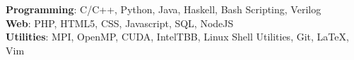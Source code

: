 {
    \normalsize

\textbf{Programming}: C/C++, Python, Java, Haskell, Bash Scripting, Verilog\\
\textbf{Web}: PHP, HTML5, CSS, Javascript, SQL, NodeJS\\
\textbf{Utilities}: MPI, OpenMP, CUDA, IntelTBB, Linux Shell Utilities, Git, \LaTeX, Vim\\
}
\vspace{2mm}
